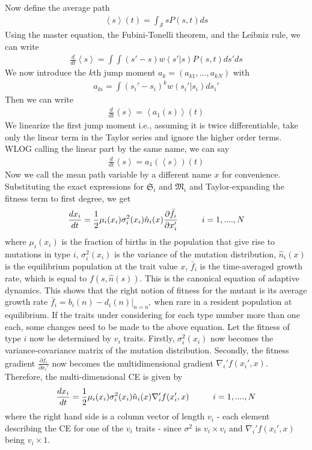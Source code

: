Now define the average path
\begin{align}
	\left< s\right>(t) = \int_{\mathcal{S}} sP(s,t)ds 
\end{align}
Using the master equation, the Fubini-Tonelli theorem, and the Leibniz rule, we can write
\begin{align}
	\frac{d}{dt} \left< s \right> = \int \int (s'-s)w(s'|s) P(s,t)ds'ds
\end{align}
We now introduce the $k$th jump moment $a_k = (a_{k1},...,a_{kN})$ with 
\begin{align}
	a_{ki} = \int (s_i'-s_i)^k w(s_i'|s_i)ds_i'
\end{align}
Then we can write 
\begin{align}
	\frac{d}{dt}\left< s \right> = \left< a_1(s) \right>(t)
\end{align}
We linearize the first jump moment i.e., assuming it is twice differentiable, take only the linear term in the Taylor series and ignore the higher order terms. 
WLOG calling the linear part by the same name, we can say 
\begin{align}
	\frac{d}{dt}\left< s \right> =  a_1(\left< s \right>)(t)
\end{align}
Now we call the mean path variable by a different name $x$ for convenience. Substituting the exact expressions for $\mathfrak{S}_i$  and $\mathfrak{M}_i$ and Taylor-expanding the fitness term to first degree, we get
\begin{align}
	\frac{dx_i}{dt} = \frac{1}{2} \mu_i(x_i) \sigma^2_i(x_i) \hat{n}_i(x) \frac{\partial \bar{f}_i}{\partial x_i'} \hspace{10mm} i=1,....,N
\end{align}
where $\mu_i(x_i)$ is the fraction of births in the population that give rise to mutations in type $i$, $\sigma^2_i(x_i)$ is the variance of the mutation distribution, $ \hat{n}_i(x)$ is the equilibrium population at the trait value $x$, $\bar{f}_i$ is the time-averaged growth rate, which is equal to $f(s, \hat{n}(s))$. 
This is the canonical equation of adaptive dynamics. 
This shows that the right notion of fitness for the mutant is its average growth rate $\bar{f}_i = \left. b_i(n)-d_i(n) \right|_{n=n^*} $ when rare in a resident population at equilibrium.
If the traits under considering for each type number more than one each, some changes need to be made to the above equation. 
Let the fitness of type $i$ now be determined by $v_i$ traits. 
Firstly, $\sigma^2_i(x_i)$ now becomes the variance-covariance matrix of the mutation distribution. 
Secondly, the fitness gradient  $\frac{\partial \bar{f}_i}{\partial x_i'}$ now becomes the multidimensional gradient $\nabla_i'f(x_i',x)$.  Therefore, the multi-dimensional CE is given by
\begin{align}
	\frac{dx_i}{dt} = \frac{1}{2} \mu_i(x_i) \sigma^2_i(x_i) \hat{n}_i(x) \nabla_i'f(x_i',x) \hspace{10mm} i=1,....,N
\end{align}
where the right hand side is a column vector of length $v_i$ - each element describing the CE for one of the $v_i$ traits - since $\sigma^2$ is $v_i \times v_i$ and $\nabla_i'f(x_i',x)$ being $v_i \times 1$. 

